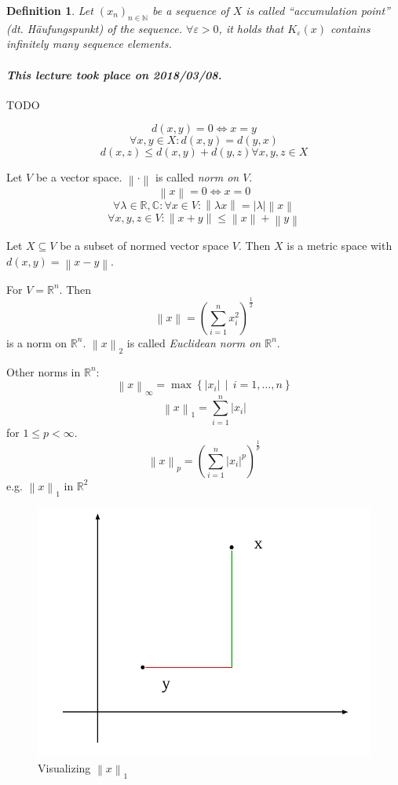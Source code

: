 \documentclass{article}
\newtheorem{definition}{Definition}  \numberwithin{definition}{section}
\newcommand{\setdef}[2]{\left\{\left.#1\,\middle|\,#2\right.\right\}}
\newcommand{\norm}[1]{\left\|#1\right\|}
\newcommand{\card}[1]{\left|#1\right|}
\newcommand{\dateref}[1]{\paragraph{\textit{This lecture took place on #1.}}}
\begin{document}
\begin{definition}
  Let $(x_n)_{n\in\mathbb N}$ be a sequence of $X$ is called \enquote{accumulation point} (\foreignlanguage{german}{dt. H\"aufungspunkt}) of the sequence.
  $\forall \varepsilon > 0$, it holds that $K_{\varepsilon}(x)$ contains infinitely many sequence elements.
\end{definition}

\dateref{2018/03/08}

TODO

\[ d(x,y) =0 \iff x = y \]
\[ \forall x,y \in X: d(x,y) = d(y,x) \]
\[ d(x,z) \leq d(x,y) + d(y,z) \forall x,y,z \in X \]

Let $V$ be a vector space. $\norm{\cdot}$ is called \emph{norm on $V$}.
\[ \norm{x} = 0 \iff x = 0 \]
\[ \forall \lambda \in \mathbb R, \mathbb C: \forall x \in V: \norm{\lambda x} = \card{\lambda} \norm{x} \]
\[ \forall x,y,z \in V: \norm{x + y} \leq \norm{x} + \norm{y} \]

Let $X \subseteq V$ be a subset of normed vector space $V$.
Then $X$ is a metric space with $d(x,y) = \norm{x - y}$.

For $V = \mathbb R^n$. Then
\[ \norm{x} = \left(\sum_{i=1}^n x_i^2\right)^{\frac12} \]
is a norm on $\mathbb R^n$. $\norm{x}_2$ is called \emph{Euclidean norm on $\mathbb R^n$}.

Other norms in $\mathbb R^n$:
\[ \norm{x}_{\infty} = \max\setdef{\card{x_i}}{i = 1,\dots,n} \]
\[ \norm{x}_1 = \sum_{i=1}^n \card{x_i} \]
for $1 \leq p < \infty$.
\[ \norm{x}_p = \left(\sum_{i=1}^n \card{x_i}^p\right)^{\frac1p} \]
e.g. $\norm{x}_1$ in $\mathbb R^2$

\begin{figure}[!ht]
  \begin{center}
    \includegraphics{img/02_1norm.pdf}
    \caption{Visualizing $\norm{x}_1$}
    \label{img:1norm}
  \end{center}
\end{figure}
\end{document}
